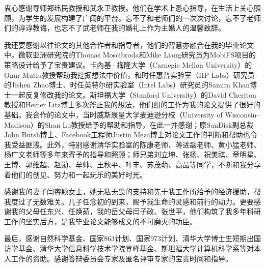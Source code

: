 
\begin{ack}

衷心感谢导师郑纬民教授和武永卫教授。他们在学术上悉心指导，在生活上关心照顾，为学生的发展构建了广阔的平台。忘不了和老师们的一次次讨论，忘不了老师们的谆谆教诲，也忘不了武老师在我的婚礼上作为主婚人的温馨致辞。

我还要感谢以往论文的其他合作者和指导者，他们的智慧亦融合在我的毕业论文中。微软亚洲研究院的Thomas Moscibroda和Mike Liang研究员为MobiFS项目的策略设计给予了宝贵建议。卡內基·梅隆大学（Carnegie Mellon University）的Onur Mutlu教授帮助我挖掘想法中价值，和时任惠普实验室（HP Labs）研究员的Jishen Zhao博士、时任英特尔研实验室（Intel Labs）研究员的Samira Khan博士一起反复修改我的论文。斯坦福大学（Stanford University）的David Cheriton教授和Heiner Litz博士多次斧正我的想法，他们组的工作为我的论文提供了很好的基础。我合作的论文中，当时威斯康星大学麦迪逊分校（University of Wisconsin–Madison）的Shan Lu教授给予的帮助和指导，在此一并感谢；原SanDisk副总裁John Butsh博士、Facebook工程师Justin Meza博士对论文工作的判断和帮助也令我受益匪浅。此外，特别感谢清华实验室的陈康老师、蒋进磊老师、黄小猛老师、杨广文老师等多年来寄予的指导和照顾；师兄弟刘立坤、张扬、祝美祺、章明星、王博、郭维超、赵勋、牟帅、王秋平、叶丰、苏茂萌、高品等同学，不断和我分享着他们的创见、努力和一起玩乐的美好时光。

感谢我的妻子闫睿颖女士，她无私无畏的支持和先于我工作所给予的经济援助，帮我度过了无数难关。儿子任念初的到来，赐予我生命的灵感和前行的动力。更要感谢我的父母任东兴、任焕茹，我的岳父母闫子政、张世平，他们构筑了我多年科研工作的坚实后方，是我毕业论文能够成文的不可磨灭的功臣。

最后，感谢自然科学基金、国家863计划、国家973计划、清华大学博士生短期出国访学基金、清华大学信息科学技术学院登峰基金、斯坦福大学计算机科学系等对本人工作的资助。感谢答辩委员会专家及匿名评审专家的宝贵时间和指导。

\end{ack}
